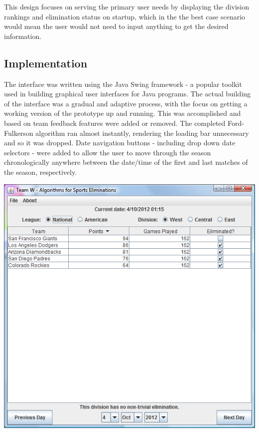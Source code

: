 This design focuses on serving the primary user needs by displaying the division 
rankings and elimination status on startup, which in the the best case scenario 
would mean the user would not need to input anything to get the desired information.

\subsection{Implementation}
The interface was written using the Java Swing framework - a popular toolkit used in
building graphical user interfaces for Java programs. The actual building of the interface
was a gradual and adaptive process, with the focus on getting a working version of the 
prototype up and running. This was accomplished and based on team feedback features were
added or removed. The completed Ford-Fulkerson algorithm ran almost instantly, rendering
the loading bar unnecessary and so it was dropped. Date navigation buttons - including drop
down date selectors - were added to allow the user to move through the season chronologically
anywhere between the date/time of the first and last matches of the season, respectively.

\includegraphics[width=\linewidth,keepaspectratio]
{images/finalDesktopUI.png}

